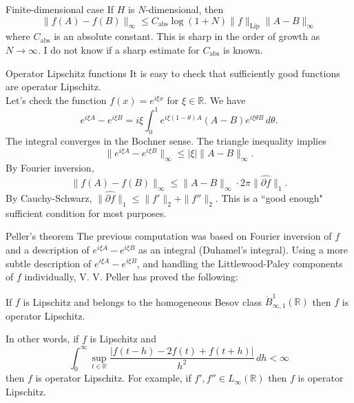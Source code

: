 \documentclass{beamer}
\numberwithin{equation}{section}
\theoremstyle{plain}
\theoremstyle{plain}
\theoremstyle{definition}
\theoremstyle{plain}
\theoremstyle{plain}
\theoremstyle{definition}
\newcommand{\Rl}{\mathbb{R}}
\begin{document}
\begin{frame}{Finite-dimensional case}
    If $H$ is $N$-dimensional, then
    \[
        \|f(A)-f(B)\|_{\infty} \leq C_{\mathrm{abs}}\log(1+N)\|f\|_{\mathrm{Lip}}\|A-B\|_{\infty}
    \]
    where $C_{\mathrm{abs}}$ is an absolute constant. This is sharp in the order of growth as $N\to\infty.$ I do not know if a sharp estimate for $C_{\mathrm{abs}}$ is known.
\end{frame}


\begin{frame}{Operator Lipschitz functions}
    It is easy to check that sufficiently good functions are operator Lipschitz.\\
    Let's check the function $f(x) = e^{i\xi x}$ for $\xi\in \Rl.$ We have
    \begin{equation*}
        e^{i\xi A}-e^{i\xi B} = i\xi\int_{0}^1 e^{i\xi (1-\theta)A}(A-B)e^{i\xi \theta B}\,d\theta.
    \end{equation*}
    The integral converges in the Bochner sense. The triangle inequality implies
    $$
        \|e^{i\xi A}-e^{i\xi B}\|_{\infty} \leq |\xi|\|A-B\|_{\infty}.
    $$
    \pause
    By Fourier inversion,
    \begin{equation*}
        \|f(A)-f(B)\|_{\infty} \leq \|A-B\|_\infty\cdot 2\pi \|\widehat{\partial f}\|_1.
    \end{equation*}
    \pause
    By Cauchy-Schwarz, $\|\widehat{\partial f}\|_1 \leq \|f'\|_2+\|f''\|_2.$ This is a ``good enough" sufficient condition for most purposes.
\end{frame}

\begin{frame}{Peller's theorem}
    The previous computation was based on Fourier inversion of $f$ and a description of $e^{i\xi A}-e^{i\xi B}$ as an integral (Duhamel's integral).
    \pause
    Using a more subtle description of $e^{i\xi A}-e^{i\xi B}$, and handling the Littlewood-Paley components of $f$
    individually, V. V. Peller has proved the following:
    \begin{theorem}[Peller (1990)]
        If $f$ is Lipschitz and belongs to the homogeneous Besov class $\dot{B}^1_{\infty,1}(\Rl)$ then $f$ is operator Lipschitz.
    \end{theorem}
    \pause
    In other words, if $f$ is Lipschitz and
    \begin{equation*}
        \int_0^\infty \sup_{t\in \Rl} \frac{|f(t-h)-2f(t)+f(t+h)|}{h^2} \,dh < \infty
    \end{equation*}
    then $f$ is operator Lipschitz. 
    \pause
    For example, if $f',f'' \in L_{\infty}(\Rl)$ then $f$ is operator Lipschitz.
\end{frame}
\end{document}
